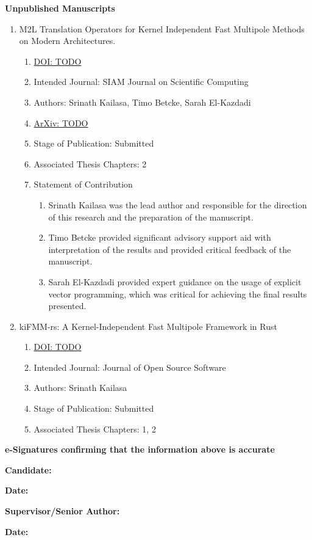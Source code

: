 \textbf{Unpublished Manuscripts}

\begin{enumerate}
    \item M2L Translation Operators for Kernel Independent Fast Multipole Methods on Modern Architectures.
    \begin{enumerate}[label=\alph*)]
      \item \href{https://ieeexplore.ieee.org/document/10124108}{DOI: TODO}
      \item Intended Journal: SIAM Journal on Scientific Computing
      \item Authors: Srinath Kailasa, Timo Betcke, Sarah El-Kazdadi
      \item  \href{https://doi.org/10.48550/arXiv.2303.08394}{ArXiv: TODO}
      \item Stage of Publication: Submitted
      \item Associated Thesis Chapters: 2
      \item Statement of Contribution
      \begin{enumerate}
        \item Srinath Kailasa was the lead author and responsible for the direction of this research and the preparation of the manuscript.
        \item Timo Betcke provided significant advisory support aid with interpretation of the results and provided critical feedback of the manuscript.
        \item Sarah El-Kazdadi provided expert guidance on the usage of explicit vector programming, which was critical for achieving the final results presented.
      \end{enumerate}
    \end{enumerate}

    \item kiFMM-rs: A Kernel-Independent Fast Multipole Framework in Rust
    \begin{enumerate}[label=\alph*)]
      \item \href{https://ieeexplore.ieee.org/document/10124108}{DOI: TODO}
      \item Intended Journal: Journal of Open Source Software
      \item Authors: Srinath Kailasa
      \item Stage of Publication: Submitted
      \item Associated Thesis Chapters: 1, 2
    \end{enumerate}

\end{enumerate}

\textbf{e-Signatures confirming that the information above is accurate}

\hspace*{10mm}

\textbf{Candidate:}

\textbf{Date:}

\hspace*{10mm}

\textbf{Supervisor/Senior Author:}

\textbf{Date:}